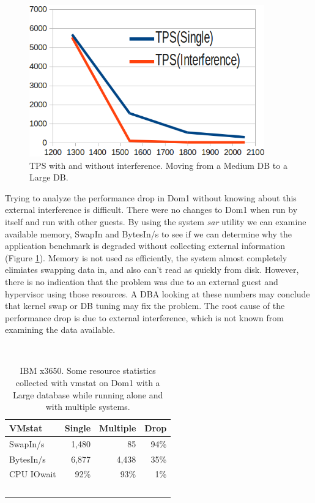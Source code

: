 \begin{figure}[!h]
  \begin{center}
  \includegraphics[width=4in]{images/MedScale.png}
  \caption{TPS with and without interference.  Moving from a Medium DB to a Large DB.}
  \label{fig:smallIO}
  \end{center}
\end{figure}

Trying to analyze the performance drop in Dom1 without knowing about this external interference is difficult.  There were no changes to Dom1 when run by itself and run with other guests.  By using the system \emph{sar} utility we can examine available memory, SwapIn and BytesIn/s to see if we can determine why the application benchmark is degraded without collecting external information (Figure \ref{fig:vmstat}).  Memory is not used as efficiently, the system almost completely elimiates swapping data in, and also can't read as quickly from disk.  However, there is no indication that the problem was due to an external guest and hypervisor using those resources.  A DBA looking at these numbers may conclude that kernel swap or DB tuning may fix the problem.  
The root cause of the performance drop is due to external interference, which is not known from examining the data available.

\begin{table}[h]
  \begin{tabular}{ l | r | r | r }
    VMstat & Single & Multiple & Drop \\ \hline
	SwapIn/s & 1,480 & 85 & 94\% \\
	BytesIn/s & 6,877 & 4,438 & 35\% \\
	CPU IOwait & 92\% & 93\% & 1\% \\
  \end{tabular}
\caption{IBM x3650.  Some resource statistics collected with vmstat on Dom1 with a Large database while running alone and with multiple systems.} 
\label{fig:vmstat}
\end{table}

